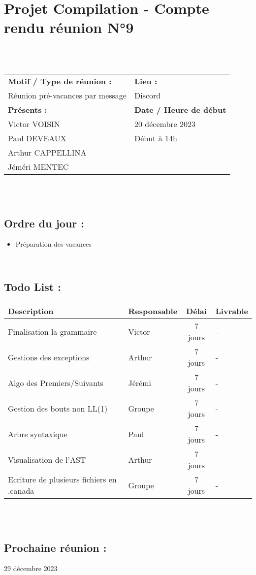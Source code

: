 \documentclass{article}
\begin{document}
\section*{Projet Compilation - Compte rendu réunion N°9}
~\\\\

\begin{tabular}{|p{7cm}|p{6cm}|}
    \hline
    \textbf{Motif / Type de réunion :}
    & \textbf{Lieu :}
    \\
    Réunion pré-vacances par message
    &
    Discord
    \\ \hline
    \textbf{Présents :}
    &
    \textbf{Date / Heure de début}
    \\
    Victor VOISIN &  20 décembre 2023\\
    Paul DEVEAUX & Début à 14h\\
    Arthur CAPPELLINA & \\
    Jéméri MENTEC &
    \\ \hline
\end{tabular}
\\\\

\subsection*{Ordre du jour :}
\begin{itemize}
    \item{Préparation des vacances}
\end{itemize}
~

\subsection*{Todo List :}
\renewcommand{\arraystretch}{1.5}
\begin{tabular}{|p{5cm}|l|c|p{4.5cm}|}
    \hline
    Description & Responsable & Délai & Livrable\\ 
    \hline
    Finalisation la grammaire & Victor & 7 jours & - \\
    Gestions des exceptions & Arthur & 7 jours & - \\
    Algo des Premiers/Suivants & Jérémi & 7 jours & - \\
    Gestion des bouts non LL(1) & Groupe & 7 jours & - \\
    Arbre syntaxique & Paul & 7 jours & - \\
    Visualisation de l'AST & Arthur & 7 jours & - \\
    Ecriture de plusieurs fichiers en .canada & Groupe & 7 jours & - \\
    \hline
\end{tabular}
\\\\

\subsection*{Prochaine réunion :}  29 décembre 2023
\end{document}
